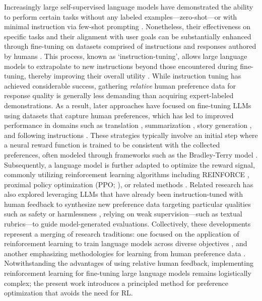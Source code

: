Increasingly large self-supervised language models have demonstrated the ability to perform certain tasks without any labeled examples—zero-shot—or with minimal instruction via few-shot prompting \citep{radford2019language, gpt3, megatron, chowdhery2022palm}. Nonetheless, their effectiveness on specific tasks and their alignment with user goals can be substantially enhanced through fine-tuning on datasets comprised of instructions and responses authored by humans \citep{mishra-etal-2022-cross, sanh2022multitask, chung2022scaling, thoppilan2022lamda}. This process, known as `instruction-tuning', allows large language models to extrapolate to new instructions beyond those encountered during fine-tuning, thereby improving their overall utility \citep{chung2022scaling}. While instruction tuning has achieved considerable success, gathering \textit{relative} human preference data for response quality is generally less demanding than acquiring expert-labeled demonstrations. As a result, later approaches have focused on fine-tuning LLMs using datasets that capture human preferences, which has led to improved performance in domains such as translation \citep{kreutzer-etal-2018-reliability}, summarization \citep{stiennon2022learning, ziegler2020finetuning}, story generation \citep{ziegler2020finetuning}, and following instructions \citep{ouyang2022training, ramamurthy2023is}. These strategies typically involve an initial step where a neural reward function is trained to be consistent with the collected preferences, often modeled through frameworks such as the Bradley-Terry model \citep{bradley1952rankanalysis}. Subsequently, a language model is further adapted to optimize the reward signal, commonly utilizing reinforcement learning algorithms including REINFORCE \citep{williams1992reinforce}, proximal policy optimization (PPO; \cite{schulman2017proximal}), or related methods \citep{ramamurthy2023is}. Related research has also explored leveraging LLMs that have already been instruction-tuned with human feedback to synthesize new preference data targeting particular qualities such as safety or harmlessness \citep{bai2022constitutional}, relying on weak supervision—such as textual rubrics—to guide model-generated evaluations. Collectively, these developments represent a merging of research traditions: one focused on the application of reinforcement learning to train language models across diverse objectives \citep{Ranzato2015SequenceLT, paulus2018a, wu2018learning}, and another emphasizing methodologies for learning from human preference data \citep{christiano2017deep, kupcsik2018learning}. Notwithstanding the advantages of using relative human feedback, implementing reinforcement learning for fine-tuning large language models remains logistically complex; the present work introduces a principled method for preference optimization that avoids the need for RL.

